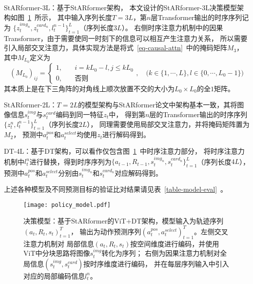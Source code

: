 StARformer-3L：基于StARformer架构，
本文设计的StARformer-3L决策模型架构如图~\ref{fig-model}~所示，
其中输入序列长度$T=3L$，第$n$层Transformer输出的时序序列记为
$\{z_t^{img_n},z_t^{card_n},l_{t}^{n-1}\}_{t=1}^{L}$（序列长度$3L$）。
右侧时序注意力机制中的因果Transformer，由于需要使同一时刻下的信息可以相互产生注意力关系，
所以需要引入局部交叉注意力，具体实现方法是将式~\ref{eq-causal-attn}~中的掩码矩阵$M_{3}$，其中$M_{L_0}$定义为
\begin{equation}
  (M_{L_0})_{ij} = \begin{cases}
    1, &\quad i=kL_0-l,j\leqslant kL_0\\
    0, &\quad \text{否则}
  \end{cases},\quad \big(k\in\{1,\cdots,L\}, l\in\{0,\cdots,L_0-1\}\big)
\end{equation}
其本质上是在下三角阵的对角线上顺次放置不交的大小为$L_0\times L_0$的全$1$矩阵。

StARformer-2L：$T=2L$的模型架构与StARformer论文中架构基本一致，其将图像信息$s_{t}^{img}$与$s_{t}^{card}$编码到同一特征$z_t$中，
得到第$n$层的Transformer输出的时序序列$\{z_t^{n}, l_{t}^{n-1}\}_{t=1}^{L}$（序列长度$2L$），
同理需要使用局部交叉注意力，并将掩码矩阵置为$M_2$，
预测中$a_{t}^{pos}$和$a_{t}^{select}$均使用$z_t$进行解码得到。

DT-4L：基于DT架构，可以看作仅包含图~\ref{fig-model}~中时序注意力部分，
将时序注意力机制中$l_t^{n}$进行替换，得到时序序列为$\{a_{t-1},R_{t-1},s_{t}^{img_n}, s_{t}^{card_n}\}_{t=1}^{L}$（序列长度$4L$），
预测中$a_{t}^{pos}$和$a_{t}^{select}$分别由$s_{t}^{img_n}$和$s_{t}^{card_n}$对应解码得到。

上述各种模型及不同预测目标的验证比对结果请见表~\ref{table-model-eval}~。

\begin{figure}[htbp]
  \centering
  \texttt{[image: policy\_model.pdf]}
  \caption{决策模型：基于StARformer的ViT+DT架构，模型输入为轨迹序列$(a_t, R_t, s_t)_{t=1}^T$，
  输出为动作预测序列$(a_t^{pos},a_t^{select})_{t=1}^T$。左侧交叉注意力机制对
  局部信息$(a_t,R_t,s_t)$按空间维度进行编码，并使用ViT中分块思路将图像$s_t^{img}$转化为序列；
  右侧为因果注意力机制对全局信息$(s^{img}_t,s^{card}_t)$按时序维度进行编码，
  并在每层序列输入中引入对应的局部编码信息$l_t^{n}$。}
  \label{fig-model}
\end{figure}